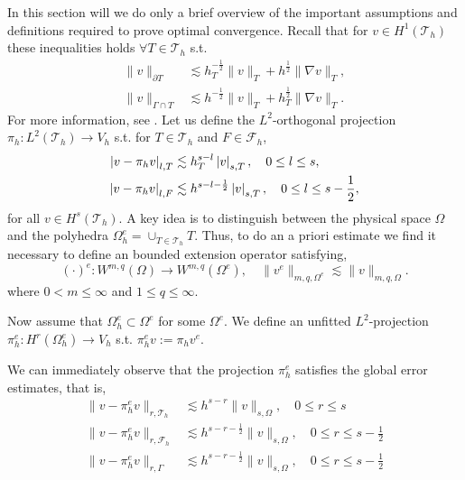 In this section will we do only a brief overview of the important assumptions and definitions required to prove optimal convergence.
Recall that for $v \in H^{1}( \mathcal{T } _{h}) $ these inequalities holds $\forall T \in \mathcal{T} _{h}$ s.t. \[
\begin{split}
    \| v \|_{ \partial T }^{  } &\lesssim h^{-\frac{1}{2}}_{T}\|  v \|_{ T }^{  }+ h^{\frac{1}{2}} \| \nabla v \|_{T  }^{   }  , \\
    \| v \|_{ \Gamma \cap T }^{  } &\lesssim  h^{-\frac{1}{2}} \| v \|_{T  }^{  }   + h^{\frac{1}{2}}_{T} \| \nabla v \|_{ T }^{  }.
\end{split}
\]
For more information, see \cite{gurkan2019stabilized}. Let us define the $L^2$-orthogonal projection $\pi _{h}: L^2( \mathcal{T} _{h}) \to V_{h}$ s.t. for $T \in \mathcal{T} _{h}$ and $F \in \mathcal{F} _{h}$,
\[
    \begin{split}
\left\lvert  v - \pi _{h} v  \right\rvert _{l,T} & \lesssim h^{s-l}_{T} \left\lvert  v  \right\rvert _{s,T}, \quad 0\le l \le s, \\
\left\lvert  v - \pi _{h}v  \right\rvert _{l,F} & \lesssim  h^{s-l-\frac{1}{2}} \left\lvert  v  \right\rvert_{s,T} , \quad 0\le l \le s -\frac{1}{2},
    \end{split}
\]
for all $v \in H^{s}( \mathcal{T} _{h}) $.
A key idea is to distinguish between the physical space $\Omega $ and the polyhedra $\Omega ^{e}_{h} = \cup _{T\in \mathcal{T} _{h} } T$. Thus, to do an
a priori estimate we find it necessary to define an bounded extension operator satisfying, \[
( \cdot ) ^{e}: W^{m,q}( \Omega )  \to W^{m,q} ( \Omega ^{e}), \quad \| v^{e} \|_{ m,q,\Omega ^{e}  }^{  } \lesssim \| v \|_{ m,q, \Omega  }^{  }.
\]
where $0< m \le \infty$ and $1 \le q \le \infty$.

Now assume that $\Omega _{h}^{e} \subset  \Omega^{e} $ for some $\Omega^{e}  $. We define an unfitted $L^2$-projection $\pi _{h}^{e}: H^{r}( \Omega ^{e}_{h}) \to V_{h}$
s.t.  $\pi ^{e} _{h} v := \pi _{h} v^{e} $.


We can immediately observe that the projection $\pi _{h}^{e}$ satisfies the global error estimates, that is,
\begin{align}
    \label{eq:projection_estimates_1}
    \| v - \pi _{h}^{e} v \|_{  r, \mathcal{T} _{h} }^{  } & \lesssim h^{s-r} \| v \|_{ s, \Omega }^{  }, \quad 0\le r\le s \\
    \label{eq:projection_estimates_2}
\| v - \pi ^{e}_{h}v \|_{ r,\mathcal{F} _{h} }^{  } & \lesssim h^{s-r-\frac{1}{2}} \| v \|_{ s, \Omega  }^{  }, \quad 0  \le  r \le   s- \frac{1}{2} \\
    \label{eq:projection_estimates_3}
\| v - \pi ^{e}_{h}v \|_{ r, \Gamma }^{  } & \lesssim h^{s-r-\frac{1}{2}} \| v \|_{ s, \Omega  }^{  }, \quad 0  \le  r \le   s- \frac{1}{2}
\end{align}

